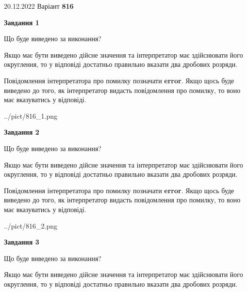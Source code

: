 \documentclass[12pt, ukrainian]{article}
\begin{document}
{20.12.2022 Варіант \No \textbf { 816 }\par}
{
\begin {Large}

{\begin {center}\textbf{Завдання 1}\end {center}}\par
Що буде виведено за виконання? \par

Якщо має бути виведено дійсне значення та інтерпретатор має здійснювати його округлення, 
то у відповіді достатньо правильно вказати два дробових розряди.

Повідомлення інтерпретатора про помилку позначати \textbf{error}.
Якщо щось буде виведено до того, як інтерпретатор видасть повідомлення про помилку, 
то воно має вказуватись у відповіді. \par

\begin{center}
	{../pict/816_1.png}
\end{center}
\newpage

{\begin {center}\textbf{Завдання 2}\end {center}}\par
Що буде виведено за виконання? \par

Якщо має бути виведено дійсне значення та інтерпретатор має здійснювати його округлення, 
то у відповіді достатньо правильно вказати два дробових розряди.

Повідомлення інтерпретатора про помилку позначати \textbf{error}.
Якщо щось буде виведено до того, як інтерпретатор видасть повідомлення про помилку, 
то воно має вказуватись у відповіді. \par

\begin{center}
	{../pict/816_2.png}
\end{center}
\newpage

{\begin {center}\textbf{Завдання 3}\end {center}}\par
Що буде виведено за виконання? \par

Якщо має бути виведено дійсне значення та інтерпретатор має здійснювати його округлення, 
то у відповіді достатньо правильно вказати два дробових розряди.


\end{Large}}
\end{document}

